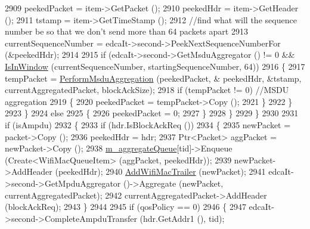 \begin{DoxyCode}
2909                           peekedPacket = item->GetPacket ();
2910                           peekedHdr = item->GetHeader ();
2911                           tstamp = item->GetTimeStamp ();
2912                           \textcolor{comment}{//find what will the sequence number be so that we don't send more than 64
       packets apart}
2913                           currentSequenceNumber = edcaIt->second->PeekNextSequenceNumberFor (&peekedHdr);
2914 
2915                           \textcolor{keywordflow}{if} (edcaIt->second->GetMsduAggregator () != 0 && 
      \hyperlink{classns3_1_1MacLow_a442078ddeb869fa7e76f35f32e0533c2}{IsInWindow} (currentSequenceNumber, startingSequenceNumber, 64))
2916                             \{
2917                               tempPacket = \hyperlink{classns3_1_1MacLow_aabd112b43fd3be901c743b21d41f787f}{PerformMsduAggregation} (peekedPacket, &
      peekedHdr, &tstamp, currentAggregatedPacket, blockAckSize);
2918                               \textcolor{keywordflow}{if} (tempPacket != 0) \textcolor{comment}{//MSDU aggregation}
2919                                 \{
2920                                   peekedPacket = tempPacket->Copy ();
2921                                 \}
2922                             \}
2923                         \}
2924                       \textcolor{keywordflow}{else}
2925                         \{
2926                           peekedPacket = 0;
2927                         \}
2928                     \}
2929                 \}
2930 
2931               \textcolor{keywordflow}{if} (isAmpdu)
2932                 \{
2933                   \textcolor{keywordflow}{if} (hdr.IsBlockAckReq ())
2934                     \{
2935                       newPacket = packet->Copy ();
2936                       peekedHdr = hdr;
2937                       Ptr<Packet> aggPacket = newPacket->Copy ();
2938                       \hyperlink{classns3_1_1MacLow_a50ea30f5dff00a3ef2683b9275717c6f}{m\_aggregateQueue}[tid]->Enqueue (Create<WifiMacQueueItem> (aggPacket, 
      peekedHdr));
2939                       newPacket->AddHeader (peekedHdr);
2940                       \hyperlink{classns3_1_1MacLow_acaafc67755f16f347e9161310d71e3ef}{AddWifiMacTrailer} (newPacket);
2941                       edcaIt->second->GetMpduAggregator ()->Aggregate (newPacket, currentAggregatedPacket);
2942                       currentAggregatedPacket->AddHeader (blockAckReq);
2943                     \}
2944 
2945                   \textcolor{keywordflow}{if} (qosPolicy == 0)
2946                     \{
2947                       edcaIt->second->CompleteAmpduTransfer (hdr.GetAddr1 (), tid);

\end{DoxyCode}
